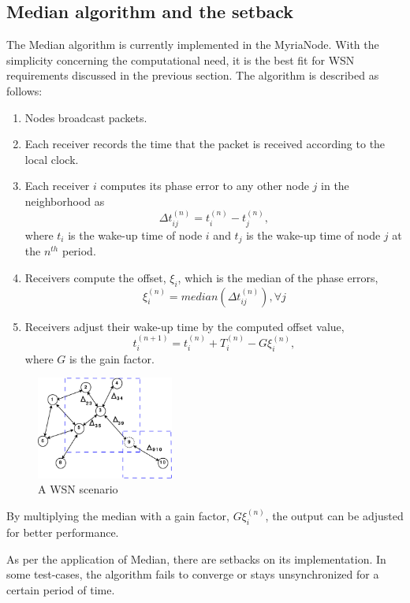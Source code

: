 \documentclass[journal]{IEEEtran}
\begin{document}
\subsection{\textbf{Median algorithm and the setback}}
\par The Median algorithm is currently implemented in the MyriaNode. With the simplicity concerning the computational need, it is the best fit for WSN requirements discussed in the previous section.
The algorithm is described as follows:
\begin{enumerate}
\item Nodes broadcast packets.
\item Each receiver records the time that the packet is received according to the local clock.
\item Each receiver $i$ computes its phase error to any other node $j$ in the neighborhood as
\begin{equation}
\Delta t_{ij}^{(n)} = t_i^{(n)} - t_j^{(n)} ,\label{err}
\end{equation}
where $t_i$ is the wake-up time of node $i$ and $t_j$ is the wake-up
time of node $j$ at the $n^{th}$ period.
\item Receivers compute the offset, $\xi_i$, which is the median of the phase errors,
\begin{equation}
\xi_i^{(n)} = median(\Delta t_{ij}^{(n)}) , \forall j
\end{equation}
\item Receivers adjust their wake-up time by the computed offset value,
\begin{equation}
t_{i}^{(n+1)} = t_i^{(n)} + T_i^{(n)} - G\xi_i^{(n)},
\end{equation}
where $G$ is the gain factor.
\end{enumerate}
\begin{figure}[b]
\centering
\includegraphics[width=0.4\textwidth]{node_field}
\caption{A WSN scenario} \label{wsn}
\end{figure}
By multiplying the median with a gain factor, $G\xi_i^{(n)}$, the output can be adjusted for better performance.
\par As per the application of Median, there are setbacks on its implementation. In some test-cases, the algorithm fails to converge or stays unsynchronized for a certain period of time.
\end{document}
